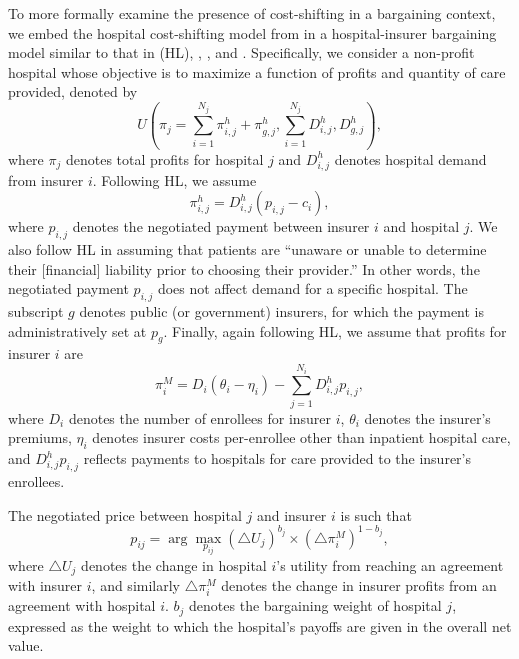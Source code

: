 \documentclass[12pt]{article}
\begin{document}
To more formally examine the presence of cost-shifting in a bargaining context, we embed the hospital cost-shifting model from \cite{dranove1988} in a hospital-insurer bargaining model similar to that in \cite{ho2017} (HL), \cite{gowrisankaran2015}, \cite{lewis2015}, and \cite{dor2004}. Specifically, we consider a non-profit hospital whose objective is to maximize a function of profits and quantity of care provided, denoted by
\begin{equation}
 U\left( \pi_{j} = \sum_{i=1}^{N_{j}} \pi_{i,j}^{h} + \pi_{g,j}^{h}, \sum_{i=1}^{N_{j}} D_{i,j}^{h}, D_{g,j}^{h} \right),
\label{eqn:nfp_objective}
\end{equation}
where $\pi_{j}$ denotes total profits for hospital $j$ and $D_{i,j}^{h}$ denotes hospital demand from insurer $i$. Following HL, we assume $$\pi_{i,j}^{h}=D_{i,j}^{h}(p_{i,j}-c_{i}),$$ where $p_{i,j}$ denotes the negotiated payment between insurer $i$ and hospital $j$. We also follow HL in assuming that patients are ``unaware or unable to determine their [financial] liability prior to choosing their provider.'' In other words, the negotiated payment $p_{i,j}$ does not affect demand for a specific hospital. The subscript $g$ denotes public (or government) insurers, for which the payment is administratively set at $p_{g}$. Finally, again following HL, we assume that profits for insurer $i$ are
\begin{equation}
\pi_{i}^{M} = D_{i} \left( \theta_{i} - \eta_{i} \right) - \sum_{j=1}^{N_{i}} D_{i,j}^{h} p_{i,j},
\label{eqn:ins_profit}
\end{equation}
where $D_{i}$ denotes the number of enrollees for insurer $i$, $\theta_{i}$ denotes the insurer's premiums, $\eta_{i}$ denotes insurer costs per-enrollee other than inpatient hospital care, and $D_{i,j}^{h} p_{i,j}$ reflects payments to hospitals for care provided to the insurer's enrollees.

The negotiated price between hospital $j$ and insurer $i$ is such that
\begin{equation}
 p_{ij}= \arg \max_{p_{ij}} \left(\triangle U_{j} \right)^{b_{j}} \times \left(\triangle \pi^{M}_{i} \right)^{1-b_{j}},
 \label{eqn:neg_price}
\end{equation}
where $\triangle U_{j}$ denotes the change in hospital $i$'s utility from reaching an agreement with insurer $i$, and similarly $\triangle \pi^{M}_{i}$ denotes the change in insurer profits from an agreement with hospital $i$. $b_{j}$ denotes the bargaining weight of hospital $j$, expressed as the weight to which the hospital's payoffs are given in the overall net value.
\end{document}
